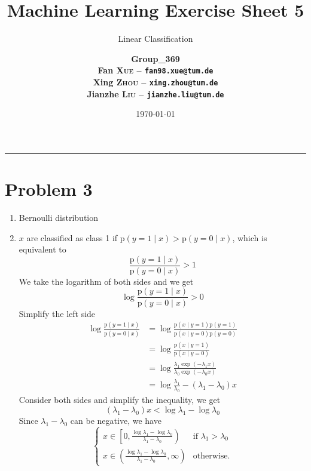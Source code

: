 \documentclass[12pt]{scrartcl}
\title{\large Machine Learning Exercise Sheet 5}
\subtitle{\Large Linear Classification}
\author{\large\bfseries Group\_369 \\
        \large Fan \textsc{Xue} -- \texttt{fan98.xue@tum.de} \\
        \large Xing \textsc{Zhou} -- \texttt{xing.zhou@tum.de} \\
        \large Jianzhe \textsc{Liu} -- \texttt{jianzhe.liu@tum.de}}
\date{\large \today}
\newcommand{\p}[1][\mathrm{p}]{\mathrm{#1}}
\begin{document}
  \maketitle
  \vspace{-1cm}
  \noindent\rule{\textwidth}{0.4pt}
    \section*{Problem 3}

  \begin{enumerate}[label=\alph*)]
    \item Bernoulli distribution
    \item $x$ are classified as class 1 if $\p(y=1 \mid x)>\p(y=0 \mid x)$, which is equivalent to
    \begin{equation*}
      \frac{\p(y=1\mid x)}{\p(y=0\mid x)} > 1
    \end{equation*}
    We take the logarithm of both sides and we get
    \begin{equation*}
      \log \frac{\p(y=1\mid x)}{\p(y=0\mid x)} > 0
    \end{equation*}
    Simplify the left side
    \begin{equation*}
      \begin{split}
        \log \frac{\p(y=1\mid x)}{\p(y=0\mid x)} &= \log \frac{\p(x\mid y=1)\p(y=1)}{\p(x\mid y=0)\p(y=0)} \\
        &= \log \frac{\p(x\mid y=1)}{\p(x\mid y=0)} \\
        &= \log \frac{\lambda_1\exp(-\lambda_1 x)}{\lambda_0 \exp(-\lambda_0 x)} \\
        &= \log\frac{\lambda_1}{\lambda_0}-(\lambda_1-\lambda_0)x
      \end{split}
    \end{equation*}
    Consider both sides and simplify the inequality, we get
    \begin{equation*}
      (\lambda_1-\lambda_0)x < \log \lambda_1 - \log \lambda_0
    \end{equation*}
    Since $\lambda_1 - \lambda_0$ can be negative, we have
    \begin{equation*}
      \begin{cases}
        x \in \left[0, \frac{\log\lambda_1 - \log\lambda_0}{\lambda_1 - \lambda_0} \right) & \text{if } \lambda_1 > \lambda_0 \\
        x \in \left( \frac{\log\lambda_1 - \log\lambda_0}{\lambda_1 - \lambda_0}, \infty \right) & \text{otherwise.}
      \end{cases}
    \end{equation*} 
  \end{enumerate}
\end{document}

